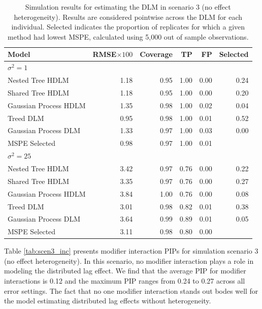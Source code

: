 \documentclass[12pt]{article}
\begin{document}
\begin{table}[!ht]
 \scriptsize
    \centering
    \caption{Simulation results for estimating the DLM in scenario 3 (no effect heterogeneity). Results are considered pointwise across the DLM for each individual. Selected indicates the proportion of replicates for which a given method had lowest MSPE, calculated using 5,000 out of sample observations.}\vspace{6pt}
    \label{tab:scen3_res}
    \begin{tabular}{lrrrrr}
        \toprule[2pt]
        Model & RMSE$\times100$ & Coverage & TP & FP & Selected\\
        \midrule
        \multicolumn{6}{l}{$\sigma^2=1$}\\
Nested Tree HDLM & 1.18 & 0.95 & 1.00 & 0.00 & 0.24\\
Shared Tree HDLM & 1.18 & 0.95 & 1.00 & 0.00 & 0.20\\
Gaussian Process HDLM & 1.35 & 0.98 & 1.00 & 0.02 & 0.04\\
\addlinespace
Treed DLM & 0.95 & 0.98 & 1.00 & 0.01 & 0.52\\
Gaussian Process DLM & 1.33 & 0.97 & 1.00 & 0.03 & 0.00\\
\addlinespace
MSPE Selected & 0.98 & 0.97 & 1.00 & 0.01 & \\
\midrule

        \multicolumn{6}{l}{$\sigma^2=25$}\\
Nested Tree HDLM & 3.42 & 0.97 & 0.76 & 0.00 & 0.22\\
Shared Tree HDLM & 3.35 & 0.97 & 0.76 & 0.00 & 0.27\\
Gaussian Process HDLM & 3.84 & 1.00 & 0.76 & 0.00 & 0.08\\
\addlinespace
Treed DLM & 3.01 & 0.98 & 0.82 & 0.01 & 0.38\\
Gaussian Process DLM & 3.64 & 0.99 & 0.89 & 0.01 & 0.05\\
\addlinespace
MSPE Selected & 3.11 & 0.98 & 0.80 & 0.00 & \\
        \bottomrule[2pt]
    \end{tabular}
\end{table}



Table \ref{tab:scen3_inc} presents modifier interaction PIPs for simulation scenario 3 (no effect heterogeneity). In this scenario, no modifier interaction plays a role in modeling the distributed lag effect. We find that the average PIP for modifier interactions is 0.12 and the maximum PIP ranges from 0.24 to 0.27 across all error settings. The fact that no one modifier interaction stands out bodes well for the model estimating distributed lag effects without heterogeneity.
\end{document}
